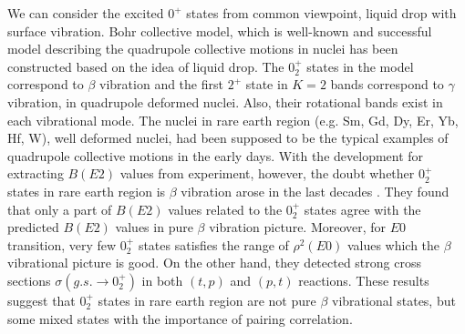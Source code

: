 \documentclass[11pt]{book} %
\begin{document}
We can consider the excited $0^+$ states from common viewpoint, liquid drop with surface vibration. Bohr collective model, which is well-known and successful model describing the quadrupole collective motions in nuclei \cite{BM75} has been constructed based on the idea of liquid drop. The $0_2^+$ states in the model correspond to $\beta$ vibration and the first $2^+$ state in $K=2$ bands correspond to $\gamma$ vibration, in quadrupole deformed nuclei. Also, their rotational bands exist in each vibrational mode. The nuclei in rare earth region (e.g. Sm, Gd, Dy, Er, Yb, Hf, W), well deformed nuclei, had been supposed to be the typical examples of quadrupole collective motions in the early days. 
With the development for extracting $B(E2)$ values from experiment, however, the doubt whether $0_2^+$ states in rare earth region is $\beta$ vibration arose in the last decades \cite{G01, Kulp08, SS11}. They found that only a part of $B(E2)$ values related to the $0_2^+$ states agree with the predicted $B(E2)$ values in pure $\beta$ vibration picture. Moreover, for $E0$ transition, very few $0_2^+$ states satisfies the range of $\rho^2(E0)$ values which the $\beta$ vibrational picture is good. On the other hand, they detected strong cross sections $\sigma(g.s.\to 0_{2}^+)$ in both $(t, p)$ and $(p, t)$ reactions. These results suggest that $0_2^+$ states in rare earth region are not pure $\beta$ vibrational states, but some mixed states with the importance of pairing correlation.
\end{document}
